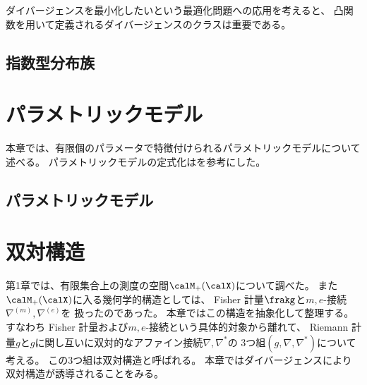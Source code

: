 \documentclass[report]{jlreq}
\begin{document}
ダイバージェンスを最小化したいという最適化問題への応用を考えると、
凸関数を用いて定義されるダイバージェンスのクラスは重要である。

\begin{definition}[$f$-ダイバージェンス]
    \TODO{}
\end{definition}



%
\section{指数型分布族}

\TODO{}


%
\chapter{パラメトリックモデル}

本章では、有限個のパラメータで特徴付けられるパラメトリックモデルについて述べる。
パラメトリックモデルの定式化は\cite{calin_geometric_2014}を参考にした。

%
\section{パラメトリックモデル}

\TODO{}


%
\chapter{双対構造}

第1章では、有限集合上の測度の空間$\calM_+(\calX)$について調べた。
また$\calM_+(\calX)$に入る幾何学的構造としては、
Fisher 計量$\frakg$と$m, e$-接続$\nabla^{(m)}, \nabla^{(e)}$を
扱ったのであった。
本章ではこの構造を抽象化して整理する。
すなわち Fisher 計量および$m, e$-接続という具体的対象から離れて、
Riemann 計量$g$と$g$に関し互いに双対的なアファイン接続$\nabla, \nabla^*$の
3つ組$(g, \nabla, \nabla^*)$について考える。
この3つ組は双対構造と呼ばれる。
本章ではダイバージェンスにより双対構造が誘導されることをみる。
\end{document}
